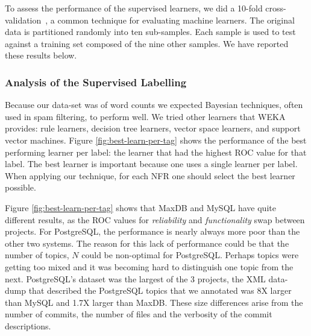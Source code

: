 \documentclass[smallextended]{svjour3}       %
\begin{document}
To assess the performance of the supervised learners, we did a 10-fold cross-validation~\cite{Kohavi1995}, a common technique for evaluating machine
learners. 
The original data is partitioned randomly into ten sub-samples. Each sample is used to test against a training set composed of the nine other samples.
We have reported these results below.%

\subsubsection{Analysis of the Supervised Labelling}
Because our data-set was of word counts we expected Bayesian techniques, often used in spam filtering, to perform well. 
We tried other learners that WEKA~\cite{weka09} provides: rule learners, decision tree learners, vector space learners, and support vector machines.  
Figure \ref{fig:best-learn-per-tag} shows the performance of the best
performing learner per label: 
the learner that had the highest ROC value for that label. 
The best learner is important because one uses a single learner per
label. When applying our technique, for each NFR one should select the best learner possible.

Figure \ref{fig:best-learn-per-tag} shows that MaxDB and MySQL have
quite different results, as the ROC values for \emph{reliability} and
\emph{functionality} swap between projects. For PostgreSQL, the
performance is nearly always more poor than the other two systems. The
reason for this lack of performance could be that the number of
topics, $N$ could be non-optimal for PostgreSQL. Perhaps topics were
getting too mixed and it was becoming hard to distinguish one topic
from the next. PostgreSQL's dataset was the largest of the 3 projects,
the XML data-dump that described the PostgreSQL topics that we
annotated was 8X larger than MySQL and 1.7X larger than MaxDB. These
size differences arise from the number of commits, the number of files
and the verbosity of the commit descriptions.
\end{document}
